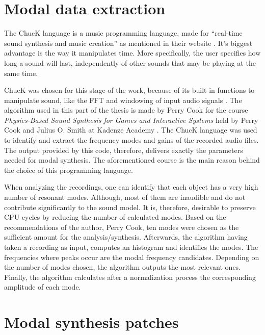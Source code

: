 \section{Modal data extraction}\label{sec:chuck}

The ChucK language is a music programming language, made for ``real-time sound synthesis and music creation'' as mentioned in their website \cite{bib:chuck}. It's biggest advantage is the way it manipulates time. More specifically, the user specifies how long a sound will last, independently of other sounds that may be playing at the same time.

ChucK was chosen for this stage of the work, because of its built-in functions to manipulate sound, like the \gls{FFT} and windowing of input audio signals \cite{bib:chuck_doc}. The algorithm used in this part of the thesis is made by Perry Cook for the course \textit{Physics-Based Sound Synthesis for Games and Interactive Systems} held by Perry Cook and Julius O. Smith at Kadenze Academy \cite{bib:physicsbasedcourse}. The ChucK language was used to identify and extract the frequency modes and gains of the recorded audio files. The output provided by this code, therefore, delivers exactly the parameters needed for modal synthesis. The aforementioned course is the main reason behind the choice of this programming language.

When analyzing the recordings, one can identify that each object has a very high number of resonant modes. Although, most of them are inaudible and do not contribute significantly to the sound model. It is, therefore, desirable to preserve \gls{CPU} cycles by reducing the number of calculated modes. Based on the recommendations of the author, Perry Cook, ten modes were chosen as the sufficient amount for the analysis/synthesis. Afterwards, the algorithm having taken a recording as input, computes an histogram and identifies the modes. The frequencies where peaks occur are the modal frequency candidates. Depending on the number of modes chosen, the algorithm outputs the most relevant ones. Finally, the algorithm calculates after a normalization process the corresponding amplitude of each mode.
 
\section{Modal synthesis patches}

